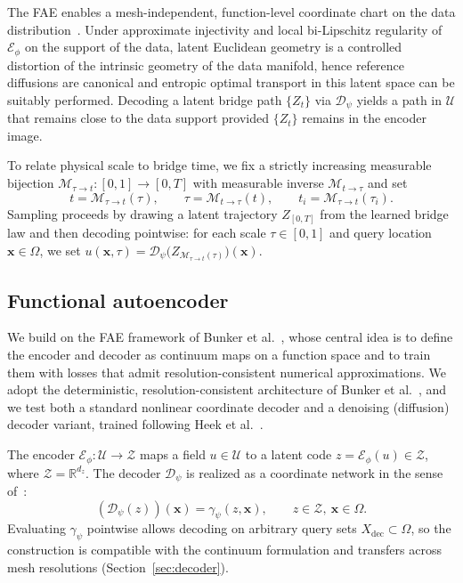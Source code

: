 \documentclass[review,onefignum,onetabnum]{siamart250211}
\newcommand{\R}{\mathbb{R}}
\newcommand{\1}{\mathbf{1}}
\newcommand{\cU}{\mathcal{U}}
\newcommand{\cZ}{\mathcal{Z}}
\newcommand{\cM}{\mathcal{M}}
\newcommand{\cE}{\mathcal{E}}
\newcommand{\cD}{\mathcal{D}}
\begin{document}
The \textsc{FAE} enables a mesh-independent, function-level coordinate chart on the data distribution~\cite{bunker2025fae}. Under approximate injectivity and local bi-Lipschitz regularity of $\cE_\phi$ on the support of the data, latent Euclidean geometry is a controlled distortion of the intrinsic geometry of the data manifold, hence reference diffusions are canonical and entropic optimal transport in this latent space can be suitably performed. Decoding a latent bridge path $\{Z_t\}$ via $\cD_\psi$ yields a path in $\cU$ that remains close to the data support provided $\{Z_t\}$ remains in the encoder image.

To relate physical scale to bridge time, we fix a strictly increasing measurable bijection $\cM_{\tau\to t}:[0,1]\to[0,T]$ with measurable inverse $\cM_{t\to\tau}$ and set
\begin{equation}
t=\cM_{\tau\to t}(\tau),\qquad
\tau=\cM_{t\to\tau}(t),\qquad
t_i=\cM_{\tau\to t}(\tau_i).
\label{eq:time_map}
\end{equation}
Sampling proceeds by drawing a latent trajectory $Z_{[0,T]}$ from the learned bridge law and then decoding pointwise: for each scale $\tau\in[0,1]$ and query location $\mathbf{x}\in\Omega$, we set $u(\mathbf{x},\tau)=\cD_\psi\bigl(Z_{\cM_{\tau\to t}(\tau)}\bigr)(\mathbf{x})$.


\subsection{Functional autoencoder}\label{sec:fae}
We build on the \textsc{FAE} framework of Bunker et al.~\cite{bunker2025fae}, whose central idea is to define the encoder and decoder as continuum maps on a function space and to train them with losses that admit resolution-consistent numerical approximations. We adopt the deterministic, resolution-consistent architecture of Bunker et al.~\cite{bunker2025fae}, and we test both a standard nonlinear coordinate decoder and a denoising (diffusion) decoder variant, trained following Heek et al.~\cite{heek2026ul}.

The encoder $\cE_\phi:\cU\to\cZ$ maps a field $u\in\cU$ to a latent code $z=\cE_\phi(u)\in\cZ$, where $\cZ=\R^{d_z}$.
The decoder $\cD_\psi$ is realized as a coordinate network in the sense of~\cite{bunker2025fae}:
\begin{equation}
(\cD_\psi(z))(\mathbf{x}) = \gamma_\psi(z,\mathbf{x}),\qquad z\in\cZ,\ \mathbf{x}\in\Omega .
\label{eq:coord_decoder_fae}
\end{equation}
Evaluating $\gamma_\psi$ pointwise allows decoding on arbitrary query sets $X_{\mathrm{dec}}\subset\Omega$, so the construction is compatible with the continuum formulation and transfers across mesh resolutions (Section~\ref{sec:decoder}).
\end{document}
